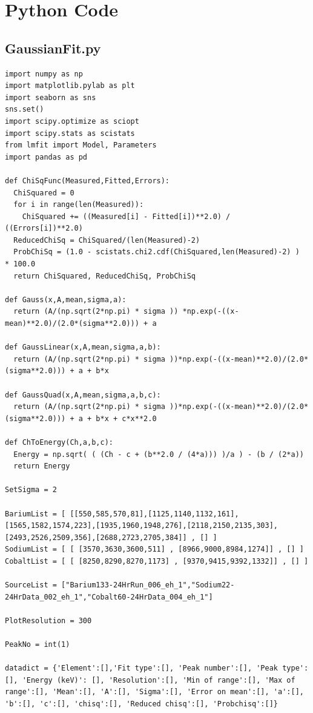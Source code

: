 \documentclass[11pt,a4paper]{article}
\begin{document}
\section{Python Code}
\subsection{GaussianFit.py}

\begin{verbatim}
import numpy as np
import matplotlib.pylab as plt
import seaborn as sns
sns.set()
import scipy.optimize as sciopt
import scipy.stats as scistats
from lmfit import Model, Parameters
import pandas as pd

def ChiSqFunc(Measured,Fitted,Errors):
  ChiSquared = 0
  for i in range(len(Measured)):
    ChiSquared += ((Measured[i] - Fitted[i])**2.0) / ((Errors[i])**2.0)
  ReducedChiSq = ChiSquared/(len(Measured)-2)
  ProbChiSq = (1.0 - scistats.chi2.cdf(ChiSquared,len(Measured)-2) )  * 100.0
  return ChiSquared, ReducedChiSq, ProbChiSq

def Gauss(x,A,mean,sigma,a):
  return (A/(np.sqrt(2*np.pi) * sigma )) *np.exp(-((x-mean)**2.0)/(2.0*(sigma**2.0))) + a

def GaussLinear(x,A,mean,sigma,a,b):
  return (A/(np.sqrt(2*np.pi) * sigma ))*np.exp(-((x-mean)**2.0)/(2.0*(sigma**2.0))) + a + b*x

def GaussQuad(x,A,mean,sigma,a,b,c):
  return (A/(np.sqrt(2*np.pi) * sigma ))*np.exp(-((x-mean)**2.0)/(2.0*(sigma**2.0))) + a + b*x + c*x**2.0    

def ChToEnergy(Ch,a,b,c):
  Energy = np.sqrt( ( (Ch - c + (b**2.0 / (4*a))) )/a ) - (b / (2*a))
  return Energy

SetSigma = 2

BariumList = [ [[550,585,570,81],[1125,1140,1132,161],[1565,1582,1574,223],[1935,1960,1948,276],[2118,2150,2135,303],[2493,2526,2509,356],[2688,2723,2705,384]] , [] ]
SodiumList = [ [ [3570,3630,3600,511] , [8966,9000,8984,1274]] , [] ]
CobaltList = [ [ [8250,8290,8270,1173] , [9370,9415,9392,1332]] , [] ]

SourceList = ["Barium133-24HrRun_006_eh_1","Sodium22-24HrData_002_eh_1","Cobalt60-24HrData_004_eh_1"]

PlotResolution = 300

PeakNo = int(1)

datadict = {'Element':[],'Fit type':[], 'Peak number':[], 'Peak type':[], 'Energy (keV)': [], 'Resolution':[], 'Min of range':[], 'Max of range':[], 'Mean':[], 'A':[], 'Sigma':[], 'Error on mean':[], 'a':[], 'b':[], 'c':[], 'chisq':[], 'Reduced chisq':[], 'Probchisq':[]}


\end{verbatim}
\end{document}
